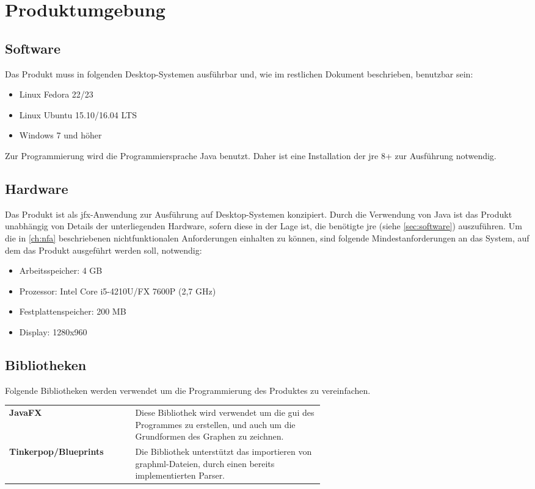 \chapter{Produktumgebung}
\label{ch:umgebung}

\section{Software}\label{sec:software}
Das Produkt muss in folgenden Desktop-Systemen ausführbar und, wie im restlichen Dokument beschrieben, benutzbar sein:
\begin{itemize}
  \setlength\itemsep{0em}
  \item Linux Fedora 22/23
  \item Linux Ubuntu 15.10/16.04 LTS
  \item Windows 7 und höher
\end{itemize}
Zur Programmierung wird die Programmiersprache Java benutzt. Daher ist eine Installation der \gls{jre} 8+ zur Ausführung notwendig.

\section{Hardware}\label{sec:hardware}
Das Produkt ist als \gls{jfx}-Anwendung zur Ausführung auf Desktop-Systemen konzipiert.
Durch die Verwendung von Java ist das Produkt unabhängig von Details der unterliegenden Hardware, sofern diese in der Lage ist, die benötigte \gls{jre} (siehe \autoref{sec:software}) auszuführen.
Um die in \autoref{ch:nfa} beschriebenen nichtfunktionalen Anforderungen einhalten zu können, sind folgende Mindestanforderungen an das System, auf dem das Produkt ausgeführt werden soll, notwendig:

\begin{itemize}
  \setlength\itemsep{0em}
  \item Arbeitsspeicher: 4 GB
  \item Prozessor: Intel Core i5-4210U/FX 7600P (2,7 GHz)
  \item Festplattenspeicher: 200 MB 
  \item Display: 1280x960
\end{itemize}

\section{Bibliotheken}\label{sec:bibliotheken}
Folgende Bibliotheken werden verwendet um die Programmierung des Produktes zu vereinfachen. \\

\begin{tabular}{ >{\bfseries}l p{0.6 \linewidth}}
  JavaFX & Diese Bibliothek wird verwendet um die \gls{gui} des Programmes zu erstellen, und auch um die Grundformen des Graphen zu zeichnen. \\
  Tinkerpop/Blueprints & Die Bibliothek unterstützt das importieren von \gls{graphml}-Dateien, durch einen bereits implementierten Parser. \\
\end{tabular}
